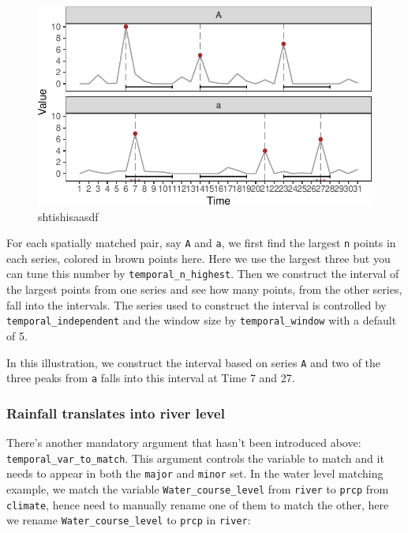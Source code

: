 \documentclass[
]{jss}
\begin{document}
\begin{CodeChunk}
\begin{figure}

{\centering \includegraphics{figures/unnamed-chunk-19-1} 

}

\caption[shtishisaasdf]{shtishisaasdf}\label{fig:unnamed-chunk-19}
\end{figure}
\end{CodeChunk}

For each spatially matched pair, say \texttt{A} and \texttt{a}, we first
find the largest \texttt{n} points in each series, colored in brown
points here. Here we use the largest three but you can tune this number
by \texttt{temporal\_n\_highest}. Then we construct the interval of the
largest points from one series and see how many points, from the other
series, fall into the intervals. The series used to construct the
interval is controlled by \texttt{temporal\_independent} and the window
size by \texttt{temporal\_window} with a default of 5.

In this illustration, we construct the interval based on series
\texttt{A} and two of the three peaks from \texttt{a} falls into this
interval at Time 7 and 27.

\hypertarget{rainfall-translates-into-river-level}{%
\subsubsection{Rainfall translates into river
level}\label{rainfall-translates-into-river-level}}

There's another mandatory argument that hasn't been introduced above:
\texttt{temporal\_var\_to\_match}. This argument controls the variable
to match and it needs to appear in both the \texttt{major} and
\texttt{minor} set. In the water level matching example, we match the
variable \texttt{Water\_course\_level} from \texttt{river} to
\texttt{prcp} from \texttt{climate}, hence need to manually rename one
of them to match the other, here we rename \texttt{Water\_course\_level}
to \texttt{prcp} in \texttt{river}:
\end{document}
